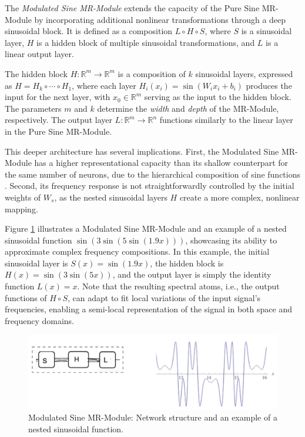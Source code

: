 The \textit{Modulated Sine MR-Module} extends the capacity of the Pure Sine MR-Module by incorporating additional nonlinear transformations through a deep sinusoidal block. It is defined as a composition \( L \circ H \circ S \), where \( S \) is a sinusoidal layer, \( H \) is a hidden block of multiple sinusoidal transformations, and \( L \) is a linear output layer.

The hidden block \( H\!:\!\mathbb{R}^m\!\to\! \mathbb{R}^m \) is a composition of \( k \) sinusoidal layers, expressed as \( H = H_k \circ \cdots \circ H_1 \), where each layer \( H_i(x_i) = \sin\left(W_i x_i + b_i\right) \) produces the input for the next layer, with \( x_0 \in \mathbb{R}^m \) serving as the input to the hidden block. The parameters \( m \) and \( k \) determine the \textit{width} and \textit{depth} of the MR-Module, respectively. The output layer \( L \!:\! \mathbb{R}^m \!\to\! \mathbb{R}^n \) functions similarly to the linear layer in the Pure Sine MR-Module.

This deeper architecture has several implications. First, the Modulated Sine MR-Module has a higher representational capacity than its shallow counterpart for the same number of neurons, due to the hierarchical composition of sine functions \citep{novello2022understanding}. Second, its frequency response is not straightforwardly controlled by the initial weights of \( W_s \), as the nested sinusoidal layers \( H \) create a more complex, nonlinear mapping.


Figure \ref{f:modulated} illustrates a Modulated Sine MR-Module and an example of a nested sinusoidal function \( \sin\left( 3\sin\left(5\sin(1.9x)\right)\right) \), showcasing its ability to approximate complex frequency compositions. In this example, the initial sinusoidal layer is \( S(x) = \sin(1.9 x) \), the hidden block is \( H(x) = \sin\left(3\sin(5x)\right) \), and the output layer is simply the identity function \( L(x) = x \). Note that the resulting spectral atoms, i.e., the output functions of \( H \circ S \), can adapt to fit local variations of the input signal's frequencies, enabling a semi-local representation of the signal in both space and frequency domains.

\begin{figure}[!h]
\centering
\includegraphics[width=0.9\linewidth]{img/ch4/modulated-sine.png}
\caption{Modulated Sine MR-Module: Network structure and an example of a nested sinusoidal function.}
\label{f:modulated}
\end{figure}

